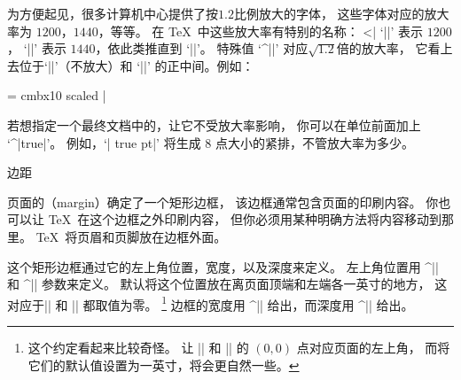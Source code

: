 {{{{{{{{{{%
%
为方便起见，很多计算机中心提供了按$1.2$比例放大的字体，
这些字体对应的放大率为 $1200$，$1440$，等等。
在 \TeX\ 中这些放大率有特别的名称：
^^|\magstep|
`||' 表示 $1200$，
`||' 表示 $1440$，依此类推直到 `||'。
特殊值 `^|\magstephalf|' 对应$\sqrt{1.2}$倍的放大率，
它看上去位于`||'（不放大）和
`||' 的正中间。例如：

\csdisplay
\font\bigbold = cmbx10 scaled \magstephalf
|

若想指定一个最终文档中的，让它不受放大率影响，
你可以在单位前面加上 `^|true|'。
例如，`| true pt|' 将生成 $8$ 点大小的紧排，不管放大率为多少。

\endconcept

\concept 边距

页面的（margin）确定了一个矩形边框，
该边框通常包含页面的印刷内容。
你也可以让 \TeX\ 在这个边框之外印刷内容，
但你必须用某种明确方法将内容移动到那里。
\TeX\ 将页眉和页脚放在边框外面。

这个矩形边框通过它的左上角位置，宽度，以及深度来定义。
左上角位置用 ^|\hoffset| 和 ^|\voffset| \ctsref\voffset 参数来定义。
默认将这个位置放在离页面顶端和左端各一英寸的地方，
这对应于|\hoffset| 和 |\voffset| 都取值为零。%
\footnote{这个约定看起来比较奇怪。
让 |\hoffset| 和 |\voffset| 的 $(0,0)$ 点对应页面的左上角，
而将它们的默认值设置为一英寸，将会更自然一些。}
边框的宽度用 ^|\hsize| 给出，而深度用 ^|\vsize| 给出。

}}}}}}}}}}
